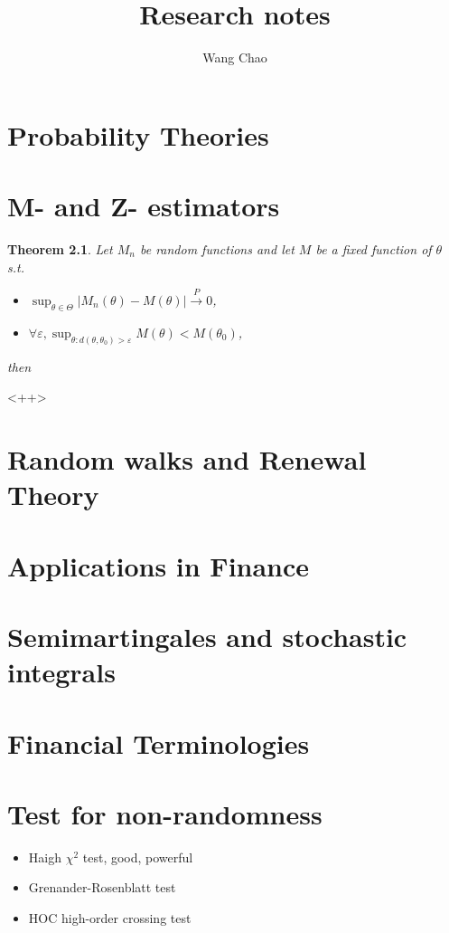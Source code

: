 \documentclass[12pt,a4paper]{book}
\author{Wang Chao}
\title{Research notes}
\def \inprob {\stackrel{P}{\longrightarrow}}
\newtheorem{theorem}{Theorem}[section]
\begin{document}
\maketitle
\tableofcontents

\chapter{Probability Theories}



\chapter{M- and Z- estimators}

  \citet{}
\begin{theorem}

  Let $M_n$ be random functions and let $M$ be a fixed function of $\theta$ s.t.
  \begin{itemize}
	\item $\sup_{\theta\in\Theta}|M_n(\theta) - M(\theta)|\inprob 0$,
	\item $\forall \varepsilon, \sup_{\theta:d(\theta,\theta_0)>\varepsilon} M(\theta) < M(\theta_0)$,
  \end{itemize}
  then 
  \label{<++>}
\end{theorem}<++>

 \chapter{Random walks and Renewal Theory}

\chapter{Applications in Finance}



\chapter{Semimartingales and stochastic integrals}


\chapter{Financial Terminologies}




\chapter{Test for non-randomness}
\begin{itemize}
\item Haigh $\chi^2$ test, good, powerful

\item Grenander-Rosenblatt test

\item HOC high-order crossing test


\end{itemize}
\end{document}

